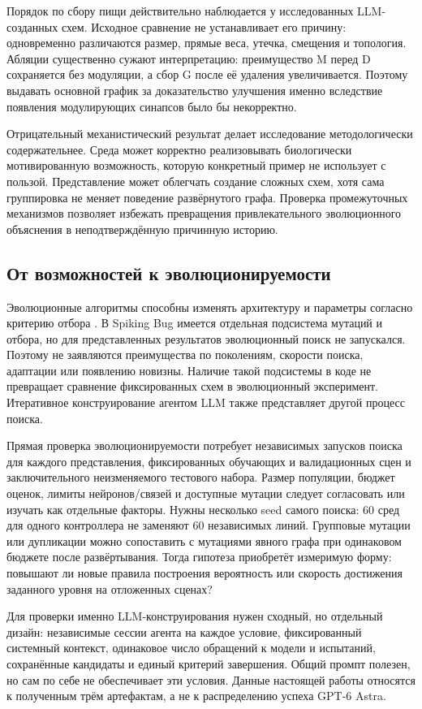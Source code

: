 \documentclass[11pt]{article}
\begin{document}
Порядок по сбору пищи действительно наблюдается у исследованных LLM-созданных схем. Исходное сравнение не устанавливает его причину: одновременно различаются размер, прямые веса, утечка, смещения и топология. Абляции существенно сужают интерпретацию: преимущество M перед D сохраняется без модуляции, а сбор G после её удаления увеличивается. Поэтому выдавать основной график за доказательство улучшения именно вследствие появления модулирующих синапсов было бы некорректно.

Отрицательный механистический результат делает исследование методологически содержательнее. Среда может корректно реализовывать биологически мотивированную возможность, которую конкретный пример не использует с пользой. Представление может облегчать создание сложных схем, хотя сама группировка не меняет поведение развёрнутого графа. Проверка промежуточных механизмов позволяет избежать превращения привлекательного эволюционного объяснения в неподтверждённую причинную историю.

\subsection{От возможностей к эволюционируемости}
Эволюционные алгоритмы способны изменять архитектуру и параметры согласно критерию отбора \citep{floreano2008}. В Spiking Bug имеется отдельная подсистема мутаций и отбора, но для представленных результатов эволюционный поиск не запускался. Поэтому не заявляются преимущества по поколениям, скорости поиска, адаптации или появлению новизны. Наличие такой подсистемы в коде не превращает сравнение фиксированных схем в эволюционный эксперимент. Итеративное конструирование агентом LLM также представляет другой процесс поиска.

Прямая проверка эволюционируемости потребует независимых запусков поиска для каждого представления, фиксированных обучающих и валидационных сцен и заключительного неизменяемого тестового набора. Размер популяции, бюджет оценок, лимиты нейронов/связей и доступные мутации следует согласовать или изучать как отдельные факторы. Нужны несколько seed самого поиска: 60 сред для одного контроллера не заменяют 60 независимых линий. Групповые мутации или дупликации можно сопоставить с мутациями явного графа при одинаковом бюджете после развёртывания. Тогда гипотеза приобретёт измеримую форму: повышают ли новые правила построения вероятность или скорость достижения заданного уровня на отложенных сценах?

Для проверки именно LLM-конструирования нужен сходный, но отдельный дизайн: независимые сессии агента на каждое условие, фиксированный системный контекст, одинаковое число обращений к модели и испытаний, сохранённые кандидаты и единый критерий завершения. Общий промпт полезен, но сам по себе не обеспечивает эти условия. Данные настоящей работы относятся к полученным трём артефактам, а не к распределению успеха GPT-6 Astra.
\end{document}
